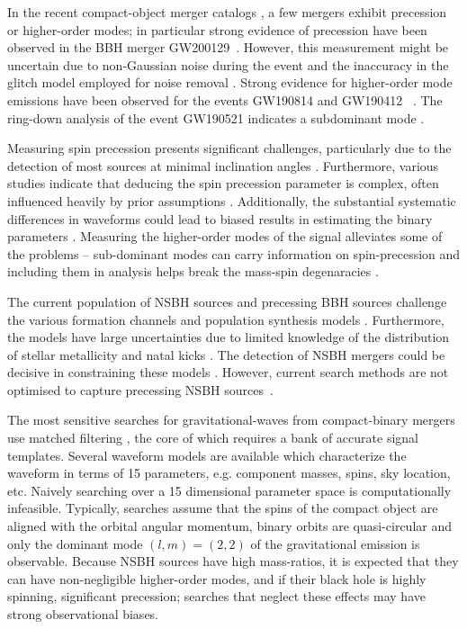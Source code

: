 In the recent compact-object merger catalogs \cite{LIGOScientific:2021djp, Olsen:2022pin, Nitz:2021uxj}, a few mergers exhibit precession or higher-order modes; in particular strong evidence of precession have been observed in the BBH merger GW200129~\cite{Hannam:2021pit}. However, this measurement might be uncertain due to non-Gaussian noise during the event and the inaccuracy in the glitch model employed for noise removal \cite{Payne:2022spz}. Strong evidence for higher-order mode emissions have been observed for the events GW190814 and GW190412 ~\cite{LIGOScientific:2020stg, LIGOScientific:2020zkf}. The ring-down analysis of the event GW190521 indicates a subdominant mode \cite{Capano:2021etf}. 

Measuring spin precession presents significant challenges, particularly due to the detection of most sources at minimal inclination angles \cite{Green:2020ptm}. Furthermore, various studies indicate that deducing the spin precession parameter is complex, often influenced heavily by prior assumptions \cite{Green:2020ptm,OShaughnessy:2014shr,Farr:2017uvj,Vitale:2014mka,Lang:2006bsg}. Additionally, the substantial systematic differences in waveforms could lead to biased results in estimating the binary parameters \cite{OShaughnessy:2014shr,Klein:2009gza}. Measuring the higher-order modes of the signal alleviates some of the problems -- sub-dominant modes can carry information on spin-precession and including them in analysis helps break the mass-spin degenaracies \cite{Krishnendu:2021cyi}. 

The current population of NSBH sources and precessing BBH sources challenge the various formation channels and population synthesis models \cite{Broekgaarden:2021efa}. Furthermore, the models have large uncertainties due to limited knowledge of the distribution of stellar metallicity \cite{Fryer:1999ht, Belczynski:2009xy} and natal kicks \cite{Lyne:1994az, Janka:2013hfa}. The detection of NSBH mergers could be decisive in constraining these models \cite{Broekgaarden:2021iew, Gupta:2017dsq}. However, current search methods are not optimised to capture precessing NSBH sources~\cite{Harry:2013tca, Usman:2015kfa, Messick:2016aqy, Aubin:2020goo, Hooper:2011rb}. 

The most sensitive searches for gravitational-waves from compact-binary mergers use matched filtering \cite{Usman:2015kfa, Messick:2016aqy, Aubin:2020goo, Hooper:2011rb}, the core of which requires a bank of accurate signal templates. Several waveform models are available \cite{Pratten:2020ceb,Ossokine:2020kjp} which characterize the waveform in terms of 15 parameters, e.g. component masses, spins, sky location, etc. Naively searching over a 15 dimensional parameter space is computationally infeasible. Typically, searches assume that the spins of the compact object are aligned with the orbital angular momentum, binary orbits are quasi-circular and only the dominant mode $(l, m) = (2,2)$ of the gravitational emission is observable. Because NSBH sources have high mass-ratios, it is expected that they can have non-negligible higher-order modes, and if their black hole is highly spinning, significant precession; searches that neglect these effects may have strong observational biases. 


